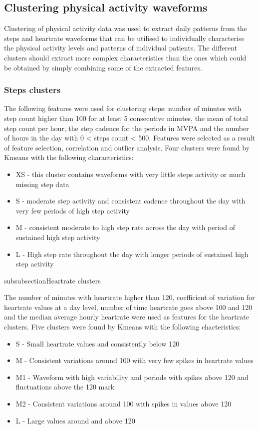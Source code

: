 \documentclass{article}
\begin{document}
\subsection{Clustering physical activity waveforms} 

Clustering of physical activity data was used to extract daily patterns from the steps and heartrate waveforms that can be utilised to individually characterise the physical activity levels and patterns of individual patients. The different clusters should extract more complex characteristics than the ones which could be obtained by simply combining some of the extracted features. 

\subsubsection{Steps clusters}

The following features were used for clustering steps: number of minutes with step count higher than 100 for at least 5 consecutive minutes, the mean of total step count per hour, the step cadence for the periods in MVPA and the number of hours in the day with 0 < steps count < 500. Features were selected as a result of feature selection, correlation and outlier analysis. Four clusters were found by Kmeans with the following characteristics: 

\begin{itemize}
\item XS - this cluster contains waveforms with very little steps activity or much missing step data 
\item S - moderate step activity and consistent cadence throughout the day with very few periods of high step activity 
\item M - consistent moderate to high step rate across the day with period of sustained high step activity  
\item L - High step rate throughout the day with longer periods of sustained high step activity
\end{itemize}

subsubsection{Heartrate clusters}

The number of minutes with heartrate higher than 120, coefficient of variation for heartrate values at a day level, number of time heartrate goes above 100 and 120 and the median average hourly heartrate were used as features for the heartrate clusters. Five clusters were found by Kmeans with the following chacteristics: 
\begin{itemize}
\item S - Small heartrate values and consistently below 120 
\item M - Consistent variations around 100 with very few spikes in heartrate values 
\item M1 - Waveform with high variability and periods with spikes above 120 and fluctuations above the 120 mark 
\item M2 - Consistent variations around 100 with spikes in values above 120 
\item L - Large values around and above 120 
\end{itemize}
\end{document}
